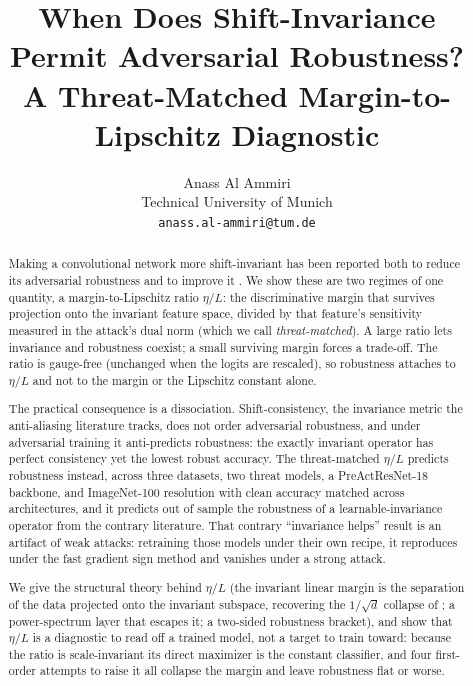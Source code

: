 \documentclass{article}
\title{When Does Shift-Invariance Permit Adversarial Robustness?\\
A Threat-Matched Margin-to-Lipschitz Diagnostic}
\author{%
  Anass Al Ammiri \\
  Technical University of Munich \\
  \texttt{anass.al-ammiri@tum.de} \\
}
\theoremstyle{definition}
\newcommand{\dd}{d}
\begin{document}
\maketitle

\begin{abstract}
Making a convolutional network more shift-invariant has been reported both to reduce its adversarial robustness \citep{ge2021shift} and to improve it \citep{grabinski2022aliasing,saha2024improving}. We show these are two regimes of one quantity, a margin-to-Lipschitz ratio $\eta/L$: the discriminative margin that survives projection onto the invariant feature space, divided by that feature's sensitivity measured in the attack's dual norm (which we call \emph{threat-matched}). A large ratio lets invariance and robustness coexist; a small surviving margin forces a trade-off. The ratio is gauge-free (unchanged when the logits are rescaled), so robustness attaches to $\eta/L$ and not to the margin or the Lipschitz constant alone.

The practical consequence is a dissociation. Shift-consistency, the invariance metric the anti-aliasing literature tracks, does not order adversarial robustness, and under adversarial training it anti-predicts robustness: the exactly invariant operator has perfect consistency yet the lowest robust accuracy. The threat-matched $\eta/L$ predicts robustness instead, across three datasets, two threat models, a PreActResNet-18 backbone, and ImageNet-100 resolution with clean accuracy matched across architectures, and it predicts out of sample the robustness of a learnable-invariance operator from the contrary literature. That contrary ``invariance helps'' result is an artifact of weak attacks: retraining those models under their own recipe, it reproduces under the fast gradient sign method and vanishes under a strong attack.

We give the structural theory behind $\eta/L$ (the invariant linear margin is the separation of the data projected onto the invariant subspace, recovering the $1/\sqrt\dd$ collapse of \citet{ge2021shift}; a power-spectrum layer that escapes it; a two-sided robustness bracket), and show that $\eta/L$ is a diagnostic to read off a trained model, not a target to train toward: because the ratio is scale-invariant its direct maximizer is the constant classifier, and four first-order attempts to raise it all collapse the margin and leave robustness flat or worse.
\end{abstract}
\end{document}
